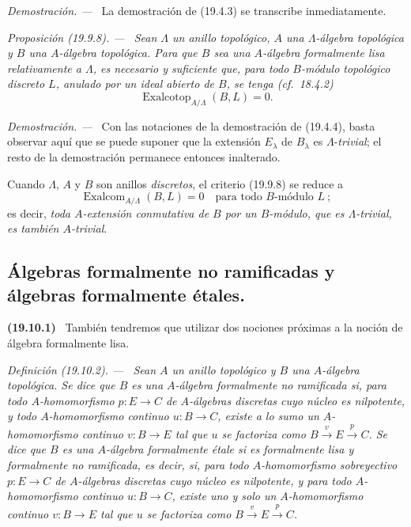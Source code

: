 \documentclass[10pt,oneside]{book}
\makeatletter
\newcommand{\setmanualcurrentlabel}[1]{\def\@currentlabel{#1}}
\newenvironment{env}[1][]{\setmanualcurrentlabel{#1}\par\medskip\noindent\textbf{(#1)}\ }{\par}
\newenvironment{definition}[1][]{%
  \setmanualcurrentlabel{#1}\par\medskip\noindent\itshape Definición (#1). ---\ }{\par}
\newenvironment{proposition}[1][]{%
  \setmanualcurrentlabel{#1}\par\medskip\noindent\itshape Proposición (#1). ---\ }{\par}
\newenvironment{proof}{%
  \par\medskip\noindent\textit{Demostración. ---\ }}{\par}
\makeatother
\begin{document}
\begin{proof}
La demostración de (19.4.3) se transcribe inmediatamente.
\end{proof}

\begin{proposition}[19.9.8]
\label{0.19.9.8-es}
Sean $\Lambda$ un anillo topológico, $A$ una $\Lambda$-álgebra topológica y
$B$ una $A$-álgebra topológica. Para que $B$ sea una $A$-álgebra formalmente
lisa relativamente a $\Lambda$, es necesario y suficiente que, para todo
$B$-módulo topológico discreto $L$, anulado por un ideal abierto de $B$, se
tenga \textup{(cf.~18.4.2)}
\[
  \operatorname{Exalcotop}_{A/\Lambda}(B,L)=0.
\]
\end{proposition}

\begin{proof}
Con las notaciones de la demostración de (19.4.4), basta observar aquí que se
puede suponer que la extensión $E_\lambda$ de $B_\lambda$ es
$\Lambda$-\emph{trivial}; el resto de la demostración permanece entonces inalterado.
\end{proof}

Cuando $\Lambda$, $A$ y $B$ son anillos \emph{discretos}, el criterio (19.9.8) se
reduce a
\begin{equation}
\tag{19.9.8.1}
\label{0.19.9.8.1-es}
  \operatorname{Exalcom}_{A/\Lambda}(B,L)=0
  \quad\text{para todo $B$-módulo $L$}~;
\end{equation}
es decir, \emph{toda $A$-extensión conmutativa de $B$ por un $B$-módulo, que es
$\Lambda$-trivial, es también $A$-trivial}.

\subsection{Álgebras formalmente no ramificadas y álgebras formalmente
étales.}
\label{subsection:0.19.10-es}
\label{0.19.10-es}

\begin{env}[19.10.1]
\label{0.19.10.1-es}
También tendremos que utilizar dos nociones próximas a la noción de álgebra
formalmente lisa.
\end{env}

\begin{definition}[19.10.2]
\label{0.19.10.2-es}
Sean $A$ un anillo topológico y $B$ una $A$-álgebra topológica. Se dice que
$B$ es una $A$-álgebra \emph{formalmente no ramificada} si, para todo
$A$-homomorfismo $p:E\to C$ de $A$-álgebras discretas cuyo núcleo es
nilpotente, y todo $A$-homomorfismo continuo $u:B\to C$, existe \emph{a lo sumo
un} $A$-homomorfismo continuo $v:B\to E$ tal que $u$ se factoriza como
$B\xrightarrow{v}E\xrightarrow{p}C$. Se dice que $B$ es una $A$-álgebra
\emph{formalmente étale} si es formalmente lisa y formalmente no ramificada, es
decir, si, para todo $A$-homomorfismo sobreyectivo $p:E\to C$ de $A$-álgebras
discretas cuyo núcleo es nilpotente, y para todo $A$-homomorfismo continuo
$u:B\to C$, existe \emph{uno y solo un} $A$-homomorfismo continuo $v:B\to E$
tal que $u$ se factoriza como $B\xrightarrow{v}E\xrightarrow{p}C$.
\end{definition}
\end{document}
